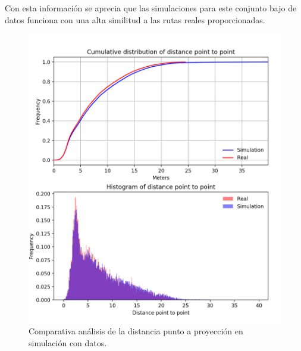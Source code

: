 Con esta información se aprecia que las simulaciones para este conjunto bajo de datos 
funciona con una alta similitud a las rutas reales proporcionadas.
\begin{figure}[!htb]
\begin{minipage}{0.48\textwidth}
\centering
\includegraphics[width=1.2\textwidth]{./Imagenes/SimulationComparativeNormalized.png}
\caption{Comparativa análisis de la distancia punto a proyección en simulación con 
datos.}
\label{figure:ComparativaReal}
\end{minipage}\hfill
\begin{minipage}{0.48\textwidth}
\centering

\end{minipage}
\end{figure}
